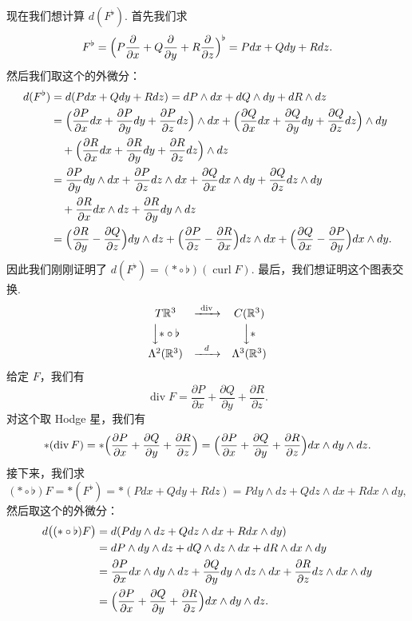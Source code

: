 现在我们想计算 $d(F^{\flat})$. 首先我们求
\[
F^{\flat}=\Bigl(P\frac{\partial}{\partial x}+Q\frac{\partial}{\partial y}+R\frac{\partial}{\partial z}\Bigr)^{\flat}=Pdx+Qdy+Rdz.
\]
然后我们取这个的外微分：
\[
\begin{aligned}
d(F^{\flat})&=d(Pdx+Qdy+Rdz)=dP\wedge dx+dQ\wedge dy+dR\wedge dz\\
&=\Bigl(\frac{\partial P}{\partial x}dx+\frac{\partial P}{\partial y}dy+\frac{\partial P}{\partial z}dz\Bigr)\wedge dx+\Bigl(\frac{\partial Q}{\partial x}dx+\frac{\partial Q}{\partial y}dy+\frac{\partial Q}{\partial z}dz\Bigr)\wedge dy\\
&\quad+\Bigl(\frac{\partial R}{\partial x}dx+\frac{\partial R}{\partial y}dy+\frac{\partial R}{\partial z}dz\Bigr)\wedge dz\\
&=\frac{\partial P}{\partial y}dy\wedge dx+\frac{\partial P}{\partial z}dz\wedge dx+\frac{\partial Q}{\partial x}dx\wedge dy+\frac{\partial Q}{\partial z}dz\wedge dy\\
&\quad+\frac{\partial R}{\partial x}dx\wedge dz+\frac{\partial R}{\partial y}dy\wedge dz\\
&=\Bigl(\frac{\partial R}{\partial y}-\frac{\partial Q}{\partial z}\Bigr)dy\wedge dz+\Bigl(\frac{\partial P}{\partial z}-\frac{\partial R}{\partial x}\Bigr)dz\wedge dx+\Bigl(\frac{\partial Q}{\partial x}-\frac{\partial P}{\partial y}\Bigr)dx\wedge dy.
\end{aligned}
\]
因此我们刚刚证明了 $d(F^{\flat})=(\ast\circ\flat)(\operatorname{curl}F)$. 最后，我们想证明这个图表交换.
\[
\begin{array}{ccc}
T\mathbb{R}^3&\xrightarrow{\ \operatorname{div}\ }&C(\mathbb{R}^3)\\[3pt]
\Big\downarrow {\ast\circ\flat}&&\Big\downarrow \ast\\[3pt]
\Lambda^2(\mathbb{R}^3)&\xrightarrow{\ \ d\ \ }&\Lambda^3(\mathbb{R}^3)
\end{array}
\]
给定 $F$，我们有
\[
\operatorname{div}F=\frac{\partial P}{\partial x}+\frac{\partial Q}{\partial y}+\frac{\partial R}{\partial z}.
\]
对这个取 Hodge 星，我们有
\[
\ast(\operatorname{div}F)=\ast\Bigl(\frac{\partial P}{\partial x}+\frac{\partial Q}{\partial y}+\frac{\partial R}{\partial z}\Bigr)=\Bigl(\frac{\partial P}{\partial x}+\frac{\partial Q}{\partial y}+\frac{\partial R}{\partial z}\Bigr)dx\wedge dy\wedge dz.
\]
接下来，我们求
\[
(\ast\circ\flat)F=\ast(F^{\flat})=\ast(Pdx+Qdy+Rdz)=Pdy\wedge dz+Qdz\wedge dx+Rdx\wedge dy,
\]
然后取这个的外微分：
\[
\begin{aligned}
d\bigl((\ast\circ\flat)F\bigr)&=d(Pdy\wedge dz+Qdz\wedge dx+Rdx\wedge dy)\\
&=dP\wedge dy\wedge dz+dQ\wedge dz\wedge dx+dR\wedge dx\wedge dy\\
&=\frac{\partial P}{\partial x}dx\wedge dy\wedge dz+\frac{\partial Q}{\partial y}dy\wedge dz\wedge dx+\frac{\partial R}{\partial z}dz\wedge dx\wedge dy\\
&=\Bigl(\frac{\partial P}{\partial x}+\frac{\partial Q}{\partial y}+\frac{\partial R}{\partial z}\Bigr)dx\wedge dy\wedge dz.
\end{aligned}
\]
